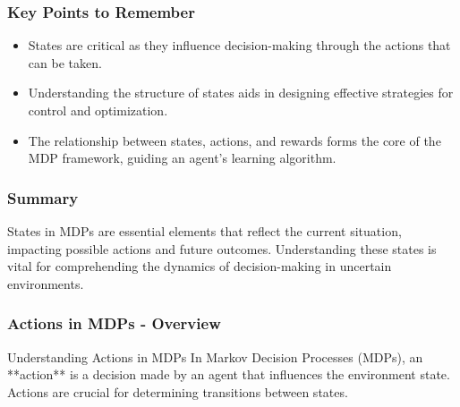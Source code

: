 \documentclass[aspectratio=169]{beamer}
\begin{document}
\begin{frame}[fragile]
    \frametitle{Key Points to Remember}
    \begin{itemize}
        \item States are critical as they influence decision-making through the actions that can be taken.
        \item Understanding the structure of states aids in designing effective strategies for control and optimization.
        \item The relationship between states, actions, and rewards forms the core of the MDP framework, guiding an agent's learning algorithm.
    \end{itemize}
\end{frame}

\begin{frame}[fragile]
    \frametitle{Summary}
    States in MDPs are essential elements that reflect the current situation, impacting possible actions and future outcomes. Understanding these states is vital for comprehending the dynamics of decision-making in uncertain environments.
\end{frame}

\begin{frame}[fragile]
    \frametitle{Actions in MDPs - Overview}
    \begin{block}{Understanding Actions in MDPs}
        In Markov Decision Processes (MDPs), an **action** is a decision made by an agent that influences the environment state. Actions are crucial for determining transitions between states.
    \end{block}
\end{frame}
\end{document}
